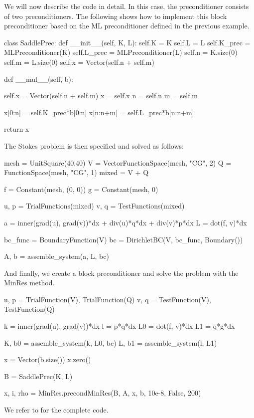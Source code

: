 We will now describe the code in detail.  In this case, the
preconditioner consists of two preconditioners.  The following shows
how to implement this block preconditioner
based on the ML preconditioner defined in the previous example.
\begin{python}
class SaddlePrec:
    def __init__(self, K, L):
        self.K = K
        self.L = L
        self.K_prec = MLPreconditioner(K)
        self.L_prec = MLPreconditioner(L)
        self.n = K.size(0)
        self.m = L.size(0)
        self.x = Vector(self.n + self.m)

    def __mul__(self, b):

        self.x = Vector(self.n + self.m)
        x = self.x
        n = self.n
        m = self.m

        x[0:n]    = self.K_prec*b[0:n]
        x[n:n+m]  = self.L_prec*b[n:n+m]

        return x
\end{python}
The Stokes problem is then specified and solved as follows:
\begin{python}
mesh = UnitSquare(40,40)
V = VectorFunctionSpace(mesh, "CG", 2)
Q = FunctionSpace(mesh, "CG", 1)
mixed = V + Q

f = Constant(mesh, (0, 0))
g = Constant(mesh, 0)

u, p = TrialFunctions(mixed)
v, q = TestFunctions(mixed)

a = inner(grad(u), grad(v))*dx + div(u)*q*dx + div(v)*p*dx
L = dot(f, v)*dx

bc_func = BoundaryFunction(V)
bc = DirichletBC(V, bc_func, Boundary())

A, b = assemble_system(a, L, bc)
\end{python}
And finally, we create a block preconditioner and solve the problem with
the MinRes method.
\begin{python}
u, p = TrialFunction(V), TrialFunction(Q)
v, q = TestFunction(V), TestFunction(Q)

k = inner(grad(u), grad(v))*dx
l = p*q*dx
L0 = dot(f, v)*dx
L1 = q*g*dx

K, b0 = assemble_system(k, L0, bc)
L, b1 = assemble_system(l, L1)

x = Vector(b.size())
x.zero()

B = SaddlePrec(K, L)

x, i, rho  = MinRes.precondMinRes(B, A, x, b, 10e-8, False, 200)
\end{python}
We refer to  for the complete code.

